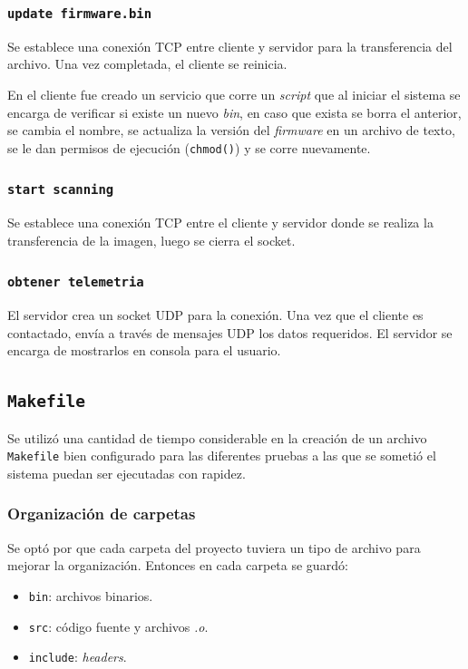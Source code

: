 \documentclass[a4paper]{article}
\begin{document}
\subsubsection{\texttt{update firmware.bin}}
Se establece una conexión TCP entre cliente y servidor para la transferencia del archivo. Una vez completada, el cliente se reinicia.

En el cliente fue creado un servicio que corre un \textit{script} que al iniciar el sistema se encarga de verificar si existe un nuevo \textit{bin}, en caso que exista se borra el anterior, se cambia el nombre, se actualiza la versión del \textit{firmware} en un archivo de texto, se le dan permisos de ejecución (\texttt{chmod()}) y se corre nuevamente.

\subsubsection{\texttt{start scanning}}
Se establece una conexión TCP entre el cliente y servidor donde se realiza la transferencia de la imagen, luego se cierra el socket.

\subsubsection{\texttt{obtener telemetria}}
El servidor crea un socket UDP para la conexión. Una vez que el cliente es contactado, envía a través de mensajes UDP los datos requeridos. El servidor se encarga de mostrarlos en consola para el usuario.

\subsection{\texttt{Makefile}}
Se utilizó una cantidad de tiempo considerable en la creación de un archivo \texttt{Makefile} bien configurado para las diferentes pruebas a las que se sometió el sistema puedan ser ejecutadas con rapidez.

\subsubsection{Organización de carpetas}
Se optó por que cada carpeta del proyecto tuviera un tipo de archivo para mejorar la organización.
Entonces en cada carpeta se guardó:
\begin{itemize}
	\item \texttt{bin}: archivos binarios.
	\item \texttt{src}: código fuente y archivos \textit{.o}.
	\item \texttt{include}: \textit{headers}.
\end{itemize}
\end{document}
